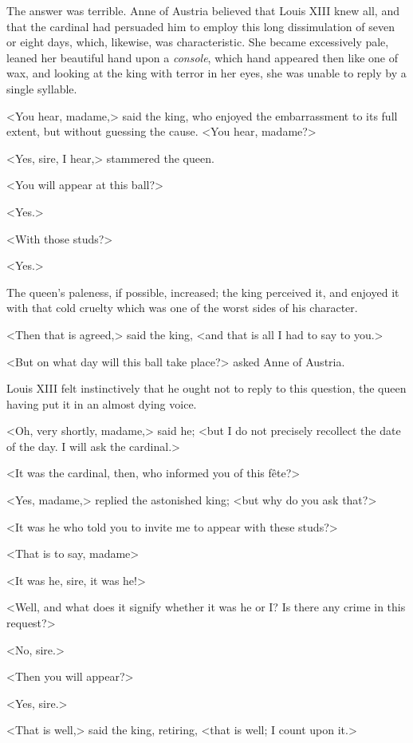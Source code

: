 The answer was terrible. Anne of Austria believed that Louis XIII knew all, and that the cardinal had persuaded him to employ this long dissimulation of seven or eight days, which, likewise, was characteristic. She became excessively pale, leaned her beautiful hand upon a \textit{console}, which hand appeared then like one of wax, and looking at the king with terror in her eyes, she was unable to reply by a single syllable. 

<You hear, madame,> said the king, who enjoyed the embarrassment to its full extent, but without guessing the cause. <You hear, madame?> 

<Yes, sire, I hear,> stammered the queen. 

<You will appear at this ball?> 

<Yes.> 

<With those studs?> 

<Yes.> 

The queen's paleness, if possible, increased; the king perceived it, and enjoyed it with that cold cruelty which was one of the worst sides of his character. 

<Then that is agreed,> said the king, <and that is all I had to say to you.> 

<But on what day will this ball take place?> asked Anne of Austria. 

Louis XIII felt instinctively that he ought not to reply to this question, the queen having put it in an almost dying voice. 

<Oh, very shortly, madame,> said he; <but I do not precisely recollect the date of the day. I will ask the cardinal.> 

<It was the cardinal, then, who informed you of this fête?> 

<Yes, madame,> replied the astonished king; <but why do you ask that?> 

<It was he who told you to invite me to appear with these studs?> 

<That is to say, madame\longdash> 

<It was he, sire, it was he!> 

<Well, and what does it signify whether it was he or I? Is there any crime in this request?> 

<No, sire.> 

<Then you will appear?> 

<Yes, sire.> 

<That is well,> said the king, retiring, <that is well; I count upon it.> 

